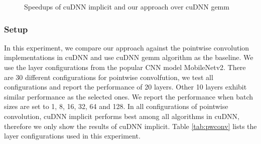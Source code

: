 \begin{figure}
\centering
	
\vspace{-2mm}
\caption{Speedups of cuDNN implicit and our approach over cuDNN gemm} \label{fig:pwexectime}
\vspace{-5mm}
\end{figure}


\subsubsection{Setup} In this experiment, we compare our approach against the pointwise convolution implementations in cuDNN and use cuDNN gemm algorithm as the baseline. 
We use the layer configurations from the popular CNN model MobileNetv2.
There are 30 different configurations for pointwise convolfution, we test all configurations and report the performance of 20 layers. 
Other 10 layers exhibit similar performance as the selected ones.  
We report the performance when batch sizes are set to 1, 8, 16, 32, 64 and 128.
In all configurations of pointwise convolution, cuDNN implicit performs best among all algorithms in cuDNN, therefore we only show the results of cuDNN implicit.
Table \ref{tab:pwconv} lists the layer configurations used in this experiment.

